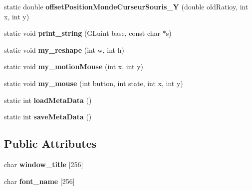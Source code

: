 \begin{DoxyCompactItemize}
\item 
\mbox{\label{classopenGlInterface_a86450d617b2f9bd4369a407da0a135ee}} 
static double {\bfseries offset\+Position\+Monde\+Curseur\+Souris\+\_\+Y} (double old\+Ratioy, int x, int y)
\item 
\mbox{\label{classopenGlInterface_af89e7f138268d2880eb18ba964f5a7f8}} 
static void {\bfseries print\+\_\+string} (G\+Luint base, const char $\ast$s)
\item 
\mbox{\label{classopenGlInterface_a791f03e629a6ba0bace620d44709fe2b}} 
static void {\bfseries my\+\_\+reshape} (int w, int h)
\item 
\mbox{\label{classopenGlInterface_a8119b9e6ff26179450ad9d4844d08a26}} 
static void {\bfseries my\+\_\+motion\+Mouse} (int x, int y)
\item 
\mbox{\label{classopenGlInterface_a487b51f6970788f69ca9465ba21be54f}} 
static void {\bfseries my\+\_\+mouse} (int button, int state, int x, int y)
\item 
\mbox{\label{classopenGlInterface_a0d1a23a768cc818139631637ed2e01cf}} 
static int {\bfseries load\+Meta\+Data} ()
\item 
\mbox{\label{classopenGlInterface_a4dd9bf76640c23212e9c3d05d23e9a3b}} 
static int {\bfseries save\+Meta\+Data} ()
\end{DoxyCompactItemize}
\subsection*{Public Attributes}
\begin{DoxyCompactItemize}
\item 
\mbox{\label{classopenGlInterface_af2e6e6db6a8a3a37b755ad499abbc2aa}} 
char {\bfseries window\+\_\+title} \mbox{[}256\mbox{]}
\item 
\mbox{\label{classopenGlInterface_a839ac2fcf0e349195b01128e0668e7b7}} 
char {\bfseries font\+\_\+name} \mbox{[}256\mbox{]}
\end{DoxyCompactItemize}

